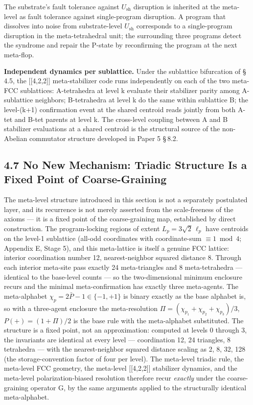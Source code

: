 \documentclass[11pt,oneside]{report}
\theoremstyle{definition}
\theoremstyle{remark}
\begin{document}
The substrate's fault tolerance against \ensuremath{U_{\mathrm{sh}}} disruption is inherited at
the meta-level as fault tolerance against single-program disruption. A
program that dissolves into noise from substrate-level \ensuremath{U_{\mathrm{sh}}} corresponds
to a single-program disruption in the meta-tetrahedral unit; the
surrounding three programs detect the syndrome and repair the P-state by
reconfirming the program at the next meta-flop.

\textbf{Independent dynamics per sublattice.} Under the sublattice
bifurcation of \S\,4.5, the [[4,2,2]] meta-stabilizer code runs
independently on each of the two meta-FCC sublattices: A-tetrahedra at
level k evaluate their stabilizer parity among A-sublattice neighbors;
B-tetrahedra at level k do the same within sublattice B; the level-(k+1)
confirmation event at the shared centroid reads jointly from both A-tet
and B-tet parents at level k. The cross-level coupling between A and B
stabilizer evaluations at a shared centroid is the structural source of
the non-Abelian commutator structure developed in Paper 5 \S\,8.2.

\subsection*{4.7 No New Mechanism: Triadic Structure Is a Fixed Point of
Coarse-Graining}

The meta-level structure introduced in this section is not a separately
postulated layer, and its recurrence is not merely asserted from the
scale-freeness of the axioms --- it is a fixed point of the coarse-graining map,
established by direct construction. The program-locking regions of extent
\ensuremath{L_{p} = 3\sqrt{2}\,\ell_{p}} have centroids on the level-1 sublattice (all-odd
coordinates with coordinate-sum \ensuremath{\equiv 1 \bmod 4}; Appendix E, Stage 5), and this
meta-lattice is itself a genuine FCC lattice: interior coordination number 12,
nearest-neighbor squared distance 8. Through each interior meta-site pass exactly
24 meta-triangles and 8 meta-tetrahedra --- identical to the base-level counts ---
so the two-dimensional minimum enclosure recurs and the minimal meta-confirmation
has exactly three meta-agents. The meta-alphabet \ensuremath{\chi_{p} = 2\bar{P} - 1 \in \{-1,+1\}}
is binary exactly as the base alphabet is, so with a three-agent enclosure the
meta-resolution \ensuremath{\Pi = (\chi_{p_1}+\chi_{p_2}+\chi_{p_3})/3},
\ensuremath{P(+) = (1+\Pi)/2} is the base rule with the meta-alphabet substituted. The
structure is a fixed point, not an approximation: computed at levels 0 through 3,
the invariants are identical at every level --- coordination 12, 24 triangles, 8
tetrahedra --- with the nearest-neighbor squared distance scaling as 2, 8, 32, 128
(the storage-convention factor of four per level). The meta-level triadic rule,
the meta-level FCC geometry, the meta-level [[4,2,2]] stabilizer dynamics, and the
meta-level polarization-biased resolution therefore recur \emph{exactly} under the
coarse-graining operator G, by the same arguments applied to the structurally
identical meta-alphabet.
\end{document}
